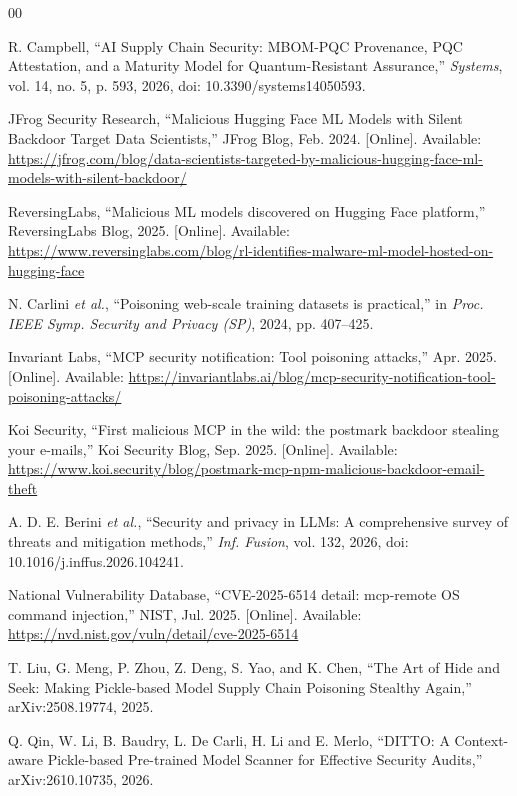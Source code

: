 \documentclass[conference]{IEEEtran}
\begin{document}
{\sloppy
\begin{thebibliography}{00}

R. Campbell, ``AI Supply Chain Security: MBOM-PQC Provenance, PQC Attestation, and a Maturity Model for Quantum-Resistant Assurance,'' \textit{Systems}, vol. 14, no. 5, p. 593, 2026, doi: 10.3390/systems14050593.

JFrog Security Research, ``Malicious Hugging Face ML Models with Silent Backdoor Target Data Scientists,'' JFrog Blog, Feb. 2024. [Online]. Available: \url{https://jfrog.com/blog/data-scientists-targeted-by-malicious-hugging-face-ml-models-with-silent-backdoor/}

ReversingLabs, ``Malicious ML models discovered on Hugging Face platform,'' ReversingLabs Blog, 2025. [Online]. Available: \url{https://www.reversinglabs.com/blog/rl-identifies-malware-ml-model-hosted-on-hugging-face}

N. Carlini \textit{et al.}, ``Poisoning web-scale training datasets is practical,'' in \textit{Proc. IEEE Symp. Security and Privacy (SP)}, 2024, pp. 407--425.

Invariant Labs, ``MCP security notification: Tool poisoning attacks,'' Apr. 2025. [Online]. Available: \url{https://invariantlabs.ai/blog/mcp-security-notification-tool-poisoning-attacks/}

Koi Security, ``First malicious MCP in the wild: the postmark backdoor stealing your e-mails,'' Koi Security Blog, Sep. 2025. [Online]. Available: \url{https://www.koi.security/blog/postmark-mcp-npm-malicious-backdoor-email-theft}

A. D. E. Berini \textit{et al.}, ``Security and privacy in LLMs: A comprehensive survey of threats and mitigation methods,'' \textit{Inf. Fusion}, vol. 132, 2026, doi: 10.1016/j.inffus.2026.104241.

National Vulnerability Database, ``CVE-2025-6514 detail: mcp-remote OS command injection,'' NIST, Jul. 2025. [Online]. Available: \url{https://nvd.nist.gov/vuln/detail/cve-2025-6514}

T. Liu, G. Meng, P. Zhou, Z. Deng, S. Yao, and K. Chen, ``The Art of Hide and Seek: Making Pickle-based Model Supply Chain Poisoning Stealthy Again,'' arXiv:2508.19774, 2025.

Q. Qin, W. Li, B. Baudry, L. De Carli, H. Li and E. Merlo, ``DITTO: A Context-aware Pickle-based Pre-trained Model Scanner for Effective Security Audits,'' arXiv:2610.10735, 2026.


\end{thebibliography}}
\end{document}
